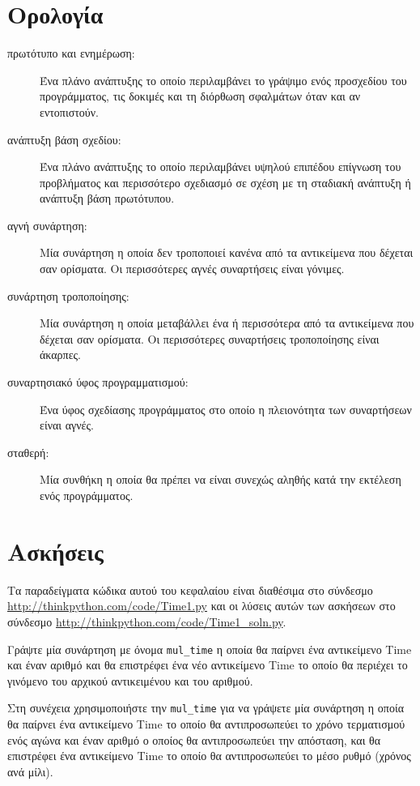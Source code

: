 \documentclass[10pt]{book}
\begin{document}
\section{Ορολογία}

\begin{description}

\item[πρωτότυπο και ενημέρωση:] Ένα πλάνο ανάπτυξης το οποίο περιλαμβάνει το γράψιμο ενός προσχεδίου του προγράμματος, τις δοκιμές και τη διόρθωση σφαλμάτων όταν και αν εντοπιστούν.

\item[ανάπτυξη βάση σχεδίου:] Ένα πλάνο ανάπτυξης το οποίο περιλαμβάνει υψηλού επιπέδου επίγνωση του προβλήματος και 
περισσότερο σχεδιασμό σε σχέση με τη σταδιακή ανάπτυξη ή ανάπτυξη βάση πρωτότυπου.

\item[αγνή συνάρτηση:] Μία συνάρτηση η οποία δεν τροποποιεί κανένα από τα αντικείμενα που δέχεται σαν ορίσματα.  Οι περισσότερες αγνές συναρτήσεις είναι γόνιμες.

\item[συνάρτηση τροποποίησης:] Μία συνάρτηση η οποία μεταβάλλει ένα ή περισσότερα από τα αντικείμενα που δέχεται σαν ορίσματα.   
Οι περισσότερες συναρτήσεις τροποποίησης είναι άκαρπες.

\item[συναρτησιακό ύφος προγραμματισμού:] Ένα ύφος σχεδίασης προγράμματος στο οποίο η πλειονότητα των συναρτήσεων είναι αγνές.

\item[σταθερή:] Μία συνθήκη η οποία θα πρέπει να είναι συνεχώς αληθής κατά την εκτέλεση ενός προγράμματος.

\end{description}


\section{Ασκήσεις}

Τα παραδείγματα κώδικα αυτού του κεφαλαίου είναι διαθέσιμα στο σύνδεσμο 
\url{http://thinkpython.com/code/Time1.py}  και οι λύσεις αυτών των ασκήσεων στο 
σύνδεσμο  \url{http://thinkpython.com/code/Time1_soln.py}.

\begin{exercise}

Γράψτε μία συνάρτηση με όνομα  \verb"mul_time"  η οποία θα παίρνει ένα αντικείμενο 
 Time  και έναν αριθμό και θα επιστρέφει ένα νέο αντικείμενο  Time  το οποίο 
θα περιέχει το γινόμενο του αρχικού αντικειμένου και του αριθμού.

Στη συνέχεια χρησιμοποιήστε την  \verb"mul_time"  για να γράψετε μία συνάρτηση η 
οποία θα παίρνει ένα αντικείμενο  Time  το οποίο θα αντιπροσωπεύει το χρόνο τερματισμού ενός αγώνα και έναν αριθμό ο οποίος θα αντιπροσωπεύει την απόσταση, και θα 
επιστρέφει ένα αντικείμενο  Time  το οποίο θα αντιπροσωπεύει το μέσο ρυθμό (χρόνος ανά μίλι).

\end{exercise}
\end{document}
